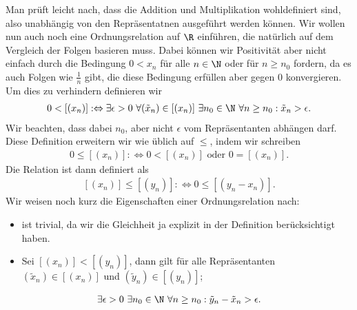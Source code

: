 \documentclass[letterpaper,10pt,english]{jupyterBook}
\begin{document}
Man prüft leicht nach, dass die Addition und Multiplikation wohldefiniert sind, also unabhängig von den Repräsentatnen ausgeführt werden können. Wir wollen nun auch noch eine Ordnungsrelation auf \(\R\) einführen, die natürlich auf dem Vergleich der Folgen basieren muss. Dabei können wir Positivität aber nicht einfach durch die Bedingung \(0 < x_n\) für alle \(n \in \N\) oder für \(n \geq n_0\) fordern, da es auch Folgen wie \(\frac{1}n\) gibt, die diese Bedingung erfüllen aber gegen \(0\) konvergieren.  Um dies zu verhindern definieren wir
\begin{equation*}
\begin{split} 0 < [(x_n)]:\Leftrightarrow \exists \epsilon > 0~\forall (\tilde x_n) \in [(x_n)]~\exists n_0 \in \N ~\forall n\geq n_0: \tilde x_n > \epsilon.\end{split}
\end{equation*}
Wir beachten, dass dabei \(n_0\), aber nicht \(\epsilon\) vom Repräsentanten abhängen darf. Diese Definition erweitern wir wie üblich auf \(\leq\), indem wir schreiben
\begin{equation*}
\begin{split}0 \leq  [(x_n)]:\Leftrightarrow 0 < [(x_n)] \text{ oder } 0 = [(x_n)].\end{split}
\end{equation*}
Die Relation ist dann definiert als
\begin{equation*}
\begin{split}[(x_n)] \leq [(y_n)] : \Leftrightarrow 0 \leq [(y_n-x_n)].\end{split}
\end{equation*}
Wir weisen noch kurz die Eigenschaften einer Ordnungsrelation nach:
\begin{itemize}
\item {} 
 ist trivial, da wir die Gleichheit ja explizit in der Definition berücksichtigt haben.

\item {} 
 Sei \([(x_n)] < [(y_n)]\), dann gilt für alle Repräsentanten \((\tilde x_n) \in [(x_n)]\) und
\((\tilde y_n) \in [(y_n)]\);

\end{itemize}
\begin{equation*}
\begin{split}\exists \epsilon > 0~\exists n_0 \in \N~\forall n \geq n_0: \tilde y_n - \tilde x_n > \epsilon.\end{split}
\end{equation*}
\end{document}
